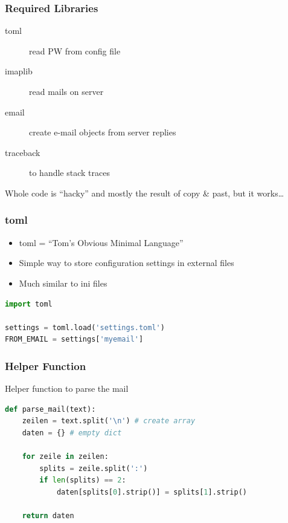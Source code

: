 \documentclass[12pt,ngerman]{beamer}
\begin{document}
\begin{frame}
\frametitle{Required Libraries}

\begin{description}
\item[toml] read PW from config file
\item[imaplib] read mails on server
\item[email] create e-mail objects from server replies
\item[traceback] to handle stack traces
\end{description}

Whole code is \enquote{hacky} and mostly the result of copy \& past, but it works\ldots
\end{frame}


\begin{frame}[fragile]
\frametitle{toml}

\begin{itemize}
	\item toml = \enquote{Tom’s Obvious Minimal Language}
	\item Simple way to store configuration settings in external files
	\item Much similar to ini files
\end{itemize}

\begin{lstlisting}[language={Python}]
import toml

settings = toml.load('settings.toml')
FROM_EMAIL = settings['myemail'] 
\end{lstlisting}

\end{frame}

\begin{frame}[fragile]
\frametitle{Helper Function}

Helper function to parse the mail

\begin{lstlisting}[language={Python},basicstyle={\footnotesize}]
def parse_mail(text):
    zeilen = text.split('\n') # create array
    daten = {} # empty dict

    for zeile in zeilen:
        splits = zeile.split(':')
        if len(splits) == 2:
            daten[splits[0].strip()] = splits[1].strip()
            
    return daten
\end{lstlisting}

\end{frame}
\end{document}
